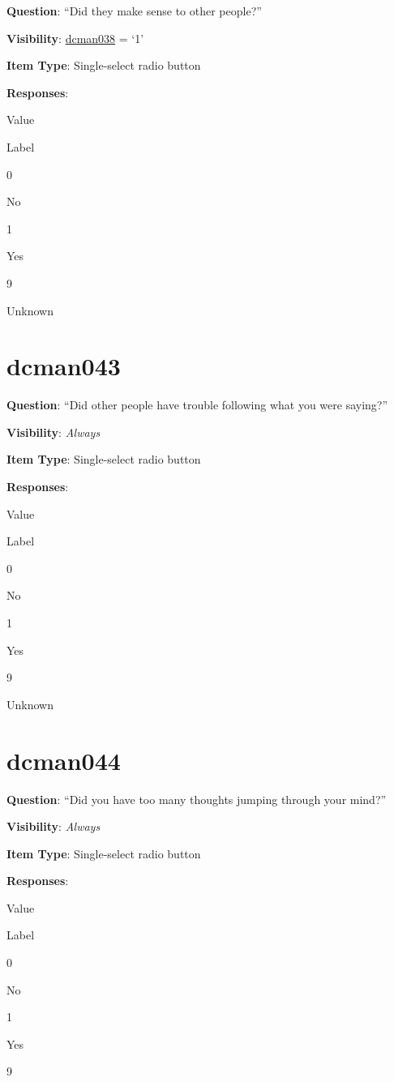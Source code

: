 \documentclass[]{book}
\begin{document}
\textbf{Question}: ``Did they make sense to other people?''

\textbf{Visibility}: \protect\hyperlink{dcman038}{dcman038} = `1'

\textbf{Item Type}: Single-select radio button

\textbf{Responses}:

Value

Label

0

No

1

Yes

9

Unknown

\hypertarget{dcman043}{%
\section{dcman043}\label{dcman043}}

\textbf{Question}: ``Did other people have trouble following what you were saying?''

\textbf{Visibility}: \emph{Always}

\textbf{Item Type}: Single-select radio button

\textbf{Responses}:

Value

Label

0

No

1

Yes

9

Unknown

\hypertarget{dcman044}{%
\section{dcman044}\label{dcman044}}

\textbf{Question}: ``Did you have too many thoughts jumping through your mind?''

\textbf{Visibility}: \emph{Always}

\textbf{Item Type}: Single-select radio button

\textbf{Responses}:

Value

Label

0

No

1

Yes

9
\end{document}
